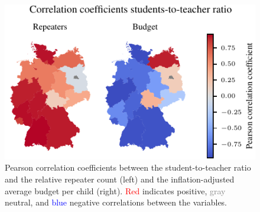 \begin{figure}[h]
    \centering
    \includegraphics{fig/fig_heatmap_correlation_students_per_teacher_repeaters_budget.pdf}
    \caption{Pearson correlation coefficients between the student-to-teacher ratio and the relative repeater count (left) and the inflation-adjusted average budget per child (right). \textcolor{red}{Red} indicates positive, \textcolor{gray}{gray} neutral, and \textcolor{blue}{blue} negative correlations between the variables.}
    \label{fig:heatmap_correlation_students_per_teacher_repeaters_budget}
\end{figure}
